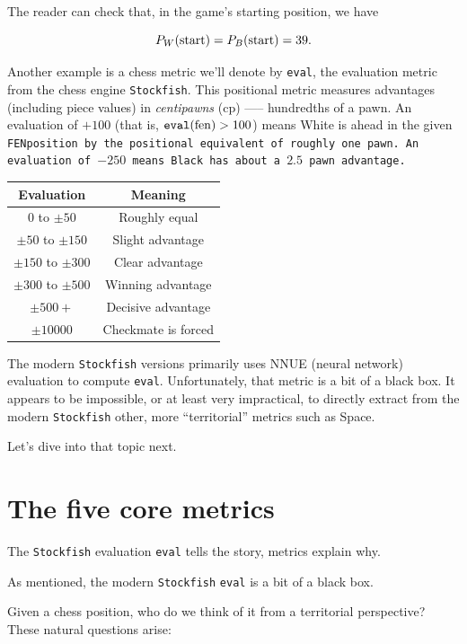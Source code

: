 \documentclass[12pt]{book}
\def\FEN{\tt{FEN}}
\begin{document}
\noindent
The reader can check that, in the game's starting position,
we have

\[
P_W({\rm start}) = P_B({\rm start}) = 39.
\]

Another example is a chess metric we'll denote
by {\tt eval}, the evaluation metric from
the chess engine {\tt Stockfish}.
This positional metric measures advantages (including piece values) in
{\it centipawns} (cp) —-- hundredths of a pawn.
An evaluation of $+100$ (that is, ${\tt eval}({\rm fen})>100$)
means White is ahead in the given \FEN position
by the positional equivalent of roughly one pawn. An evaluation of
$-250$ means Black has about a $2.5$ pawn advantage.

\begin{center}
\begin{tabular}{|c|c|}
Evaluation & Meaning \\ \hline
 $0$ to $\pm 50$ & Roughly equal \\
 $\pm 50$ to $\pm 150$ & Slight advantage \\
 $\pm 150$ to $\pm 300$ & Clear advantage \\
 $\pm 300$ to $\pm 500$ & Winning advantage \\
 $\pm 500+$ & Decisive advantage \\
$\pm 10000$ & Checkmate is forced \\
\end{tabular}
\end{center}

The modern {\tt Stockfish} versions primarily uses NNUE (neural network)
evaluation to compute {\tt eval}. Unfortunately, that metric is a bit of
a black box. It appears to be impossible, or at least very impractical, to
directly extract from the modern {\tt Stockfish} other,
more ``territorial'' metrics such as Space.

Let's dive into that topic next.


\section{The five core metrics}

The {\tt Stockfish} evaluation {\tt eval} tells the story, metrics explain why.

As mentioned,
the modern {\tt Stockfish} {\tt eval} is a bit of a black box.

Given a chess position, who do we think of it from a territorial
perspective? These natural questions arise:
\end{document}
